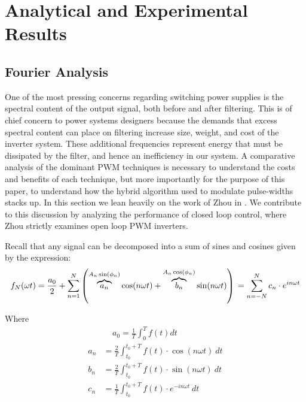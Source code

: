 
\chapter{Analytical and Experimental Results} %

\label{Chapter5} %


\section{Fourier Analysis}
\label{Fourier}
One of the most pressing concerns regarding switching power supplies is the spectral content of the output signal, both before and after filtering. This is of chief concern to power systems designers because the demands that excess spectral content can place on filtering increase size, weight, and cost of the inverter system. These additional frequencies represent energy that must be dissipated by the filter, and hence an inefficiency in our system. A comparative analysis of the dominant PWM techniques is necessary to understand the costs and benefits of each technique, but more importantly for the purpose of this paper, to understand how the hybrid algorithm used to modulate pulse-widths stacks up. In this section we lean heavily on the work of Zhou in \cite{FourierAnalysis}. We contribute to this discussion by analyzing the performance of closed loop control, where Zhou strictly examines open loop PWM inverters.

Recall that any signal can be decomposed into a sum of sines and cosines given by the expression:
\begin{equation}
f_N(\omega t) = \frac{a_0}{2} + \sum_{n=1}^N \left(\overbrace{a_n}^{A_n \sin(\phi_n)} \cos(n\omega t) + \overbrace{b_n}^{A_n \cos(\phi_n)} \sin(n\omega t)\right)\\
= \sum_{n=-N}^N c_n\cdot e^{in\omega t}
\end{equation}

Where
\begin{align*}
& ~~~~~ a_0 = \frac{1}{T}\int_{0}^{T}f(t)dt \\
a_n &= \frac{2}{T}\int_{t_0}^{t_0+T} f(t)\cdot  \cos(n\omega t)\ dt \\
b_n &= \frac{2}{T}\int_{t_0}^{t_0+T} f(t)\cdot  \sin(n\omega t)\ dt \\
c_n &= \frac{1}{T}\int_{t_0}^{t_0+T} f(t)\cdot e^{-in\omega t}\ dt
\end{align*}


